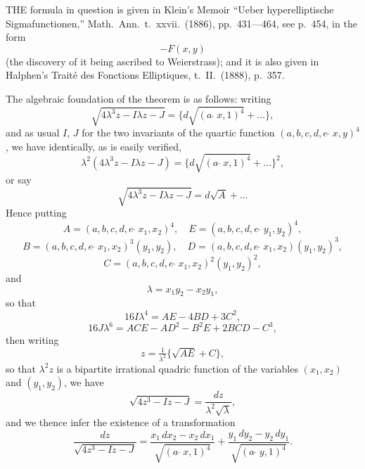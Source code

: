 \documentclass[11pt,a4paper]{book}
\begin{document}
THE formula in question is given in Klein's Memoir ``Ueber hyperelliptische Sigmafunctionen,'' Math.\ Ann.\ t.\ xxvii.\ (1886), pp.\ 431---464, see p.\ 454, in the form
\[
-F(x, y)
\]
(the discovery of it being ascribed to Weierstrass); and it is also given in Halphen's Trait\'e des Fonctions Elliptiques, t.\ II.\ (1888), p.\ 357.

The algebraic foundation of the theorem is as follows: writing
\[
\sqrt{4\lambda^3z - I\lambda z - J} = \{d\sqrt{(a\,\check{\,}\,x, 1)^4} + \ldots\},
\]
and as usual $I$, $J$ for the two invariants of the quartic function $(a, b, c, d, e \,\check{\,}\, x, y)^4$, we have identically, as is easily verified,
\[
\lambda^2(4\lambda^3z - I\lambda z - J) = \{d\sqrt{(a\,\check{\,}\,x, 1)^4} + \ldots\}^2,
\]
or say
\[
\sqrt{4\lambda^3z - I\lambda z - J} = d\sqrt{A} + \ldots
\]
Hence putting
\[
A = (a, b, c, d, e \,\check{\,}\, x_1, x_2)^4,\quad E = (a, b, c, d, e \,\check{\,}\, y_1, y_2)^4,
\]
\[
B = (a, b, c, d, e \,\check{\,}\, x_1, x_2)^3(y_1, y_2),\quad D = (a, b, c, d, e \,\check{\,}\, x_1, x_2)(y_1, y_2)^3,
\]
\[
C = (a, b, c, d, e \,\check{\,}\, x_1, x_2)^2(y_1, y_2)^2,
\]
and
\[
\lambda = x_1y_2 - x_2y_1,
\]
so that
\[
16I\lambda^4 = AE - 4BD + 3C^2,
\]
\[
16J\lambda^6 = ACE - AD^2 - B^2E + 2BCD - C^3,
\]
then writing
\[
z = \tfrac{1}{\lambda^2}\{\sqrt{AE} + C\},
\]
so that $\lambda^2z$ is a bipartite irrational quadric function of the variables $(x_1, x_2)$ and $(y_1, y_2)$, we have
\[
\sqrt{4z^3 - Iz - J} = \frac{dz}{\lambda^2\sqrt{\lambda}},
\]
and we thence infer the existence of a transformation
\[
\frac{dz}{\sqrt{4z^3 - Iz - J}} = \frac{x_1\,dx_2 - x_2\,dx_1}{\sqrt{(a\,\check{\,}\,x, 1)^4}} + \frac{y_1\,dy_2 - y_2\,dy_1}{\sqrt{(a\,\check{\,}\,y, 1)^4}}.
\]
\end{document}
